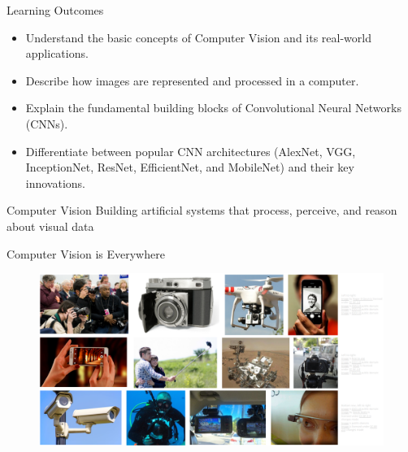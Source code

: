 \documentclass[10pt]{beamer}
\theoremstyle{remark}
\theoremstyle{definition}
\begin{document}
\begin{frame}{Learning Outcomes}
\begin{itemize}
    \item Understand the basic concepts of Computer Vision and its real-world applications.
    \item Describe how images are represented and processed in a computer.
    \item Explain the fundamental building blocks of Convolutional Neural Networks (CNNs).
    \item Differentiate between popular CNN architectures (AlexNet, VGG, InceptionNet, ResNet, EfficientNet, and MobileNet) and their key innovations.
\end{itemize}
\end{frame}



\begin{frame}{Computer Vision}
\centering
Building artificial systems that process, perceive, and reason about visual data

    
\end{frame}

\begin{frame}{Computer Vision is Everywhere}
\begin{figure}
\centering
\includegraphics[width=1.0\textwidth,height=1.0\textheight,keepaspectratio]{./images/cv_1.png}
\end{figure}
    
\end{frame}
\end{document}

